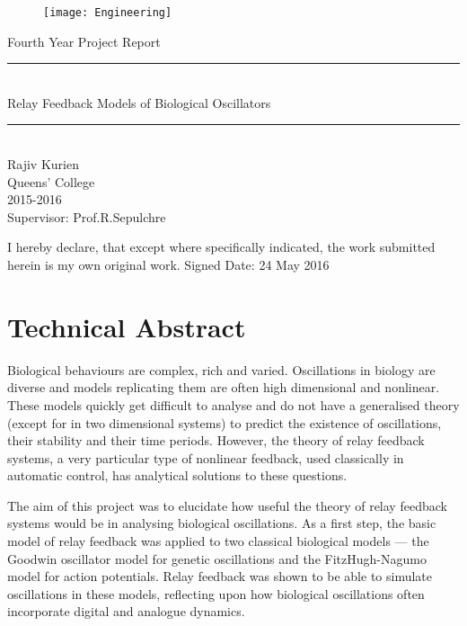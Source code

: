 \documentclass[a4paper, 12pt]{article}
\begin{document}
\begin{titlepage}
 \vspace*{\fill}
	\begin{center}
    	\begin{figure}
			\texttt{[image: Engineering]}
		\end{figure}
		{\Large Fourth Year Project Report} \vspace{0.25cm}
		\rule{\textwidth}{.1pt} \\[0.25cm]
		{\Huge Relay Feedback Models of Biological Oscillators}\\%
		\rule{\textwidth}{.1pt} \\[0.5cm]
		\Large{
	Rajiv Kurien\\Queens' College\\2015-2016 \\ \vspace{2cm} Supervisor: Prof.R.Sepulchre
		}
	\end{center}
     \vspace*{\fill}
 I hereby declare, that except where specifically indicated, the work submitted herein is my own original work. 
 \newline Signed \hrulefill  \hspace{2cm} Date: 24 May 2016 \hspace{1cm}
\end{titlepage}
\section*{Technical Abstract}

\hspace{0.5cm} Biological behaviours are complex, rich and varied. Oscillations in biology are diverse and models replicating them are often high dimensional and nonlinear. These models quickly get difficult to analyse and do not have a generalised theory (except for in two dimensional systems) to predict the existence of oscillations, their stability and their time periods. However, the theory of relay feedback systems, a very particular type of nonlinear feedback, used classically in automatic control, has analytical solutions to these questions. 

The aim of this project was to elucidate how useful the theory of relay feedback systems would be in analysing biological oscillations. As a first step, the basic model of relay feedback was applied to two classical biological models --- the Goodwin oscillator model for genetic oscillations and the FitzHugh-Nagumo model for action potentials. Relay feedback was shown to be able to simulate oscillations in these models, reflecting upon how biological oscillations often incorporate digital and analogue dynamics. 
\end{document}
